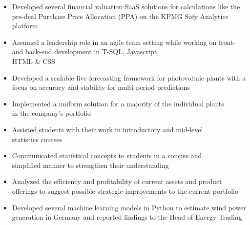 \documentclass[9pt,a4paper,ragged2e]{altacv}
\begin{document}
    \medskip


    \begin{itemize}
        \item Developed several financial valuation SaaS solutions for calculations like the pre-deal Purchase Price Allocation (PPA) on the KPMG Sofy Analytics platform
        \item Assumed a leadership role in an agile team setting while working on front- and back-end development in T-SQL, Javascript, \\ HTML \& CSS
    \end{itemize}

    \divider

    \begin{itemize}
        \item Developed a scalable live forecasting framework for photovoltaic plants with a focus on accuracy and stability for multi-period predictions
        \item Implemented a uniform solution for a majority of the individual plants \\ in the company's portfolio
    \end{itemize}

    \divider

    \begin{itemize}
        \item Assisted students with their work in introductory and mid-level \\ statistics courses
        \item Communicated statistical concepts to students in a concise and \\ simplified manner to strengthen their understanding
    \end{itemize}

    \divider

    \begin{itemize}
        \item Analyzed the efficiency and profitability of current assets and product offerings to suggest possible strategic improvements to the current portfolio
        \item Developed several machine learning models in Python to estimate wind power generation in Germany and reported findings to the Head of Energy Trading
    \end{itemize}
\end{document}
